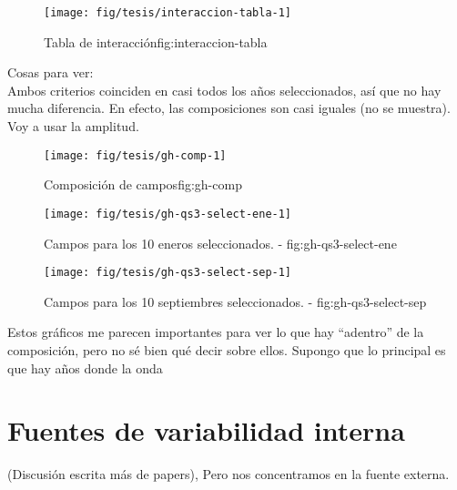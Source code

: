 \documentclass[spanish,a4paper]{book}
\begin{document}
\begin{figure}

{\centering \texttt{[image: fig/tesis/interaccion-tabla-1]} 

}

\caption{Tabla de interacción{fig:interaccion-tabla}}\label{fig:interaccion-tabla}
\end{figure}

Cosas para ver:\\
Ambos criterios coinciden en casi todos los años seleccionados, así que
no hay mucha diferencia. En efecto, las composiciones son casi iguales
(no se muestra). Voy a usar la amplitud.

\begin{figure}

{\centering \texttt{[image: fig/tesis/gh-comp-1]} 

}

\caption{Composición de campos{fig:gh-comp}}\label{fig:gh-comp}
\end{figure}

\begin{figure}

{\centering \texttt{[image: fig/tesis/gh-qs3-select-ene-1]} 

}

\caption{Campos para los 10 eneros seleccionados. - fig:gh-qs3-select-ene}\label{fig:gh-qs3-select-ene}
\end{figure}

\begin{figure}

{\centering \texttt{[image: fig/tesis/gh-qs3-select-sep-1]} 

}

\caption{Campos para los 10 septiembres seleccionados. - fig:gh-qs3-select-sep}\label{fig:gh-qs3-select-sep}
\end{figure}

Estos gráficos me parecen importantes para ver lo que hay ``adentro'' de
la composición, pero no sé bien qué decir sobre ellos. Supongo que lo
principal es que hay años donde la onda

\section{Fuentes de variabilidad
interna}\label{fuentes-de-variabilidad-interna}

(Discusión escrita más de papers), Pero nos concentramos en la fuente
externa.
\end{document}
